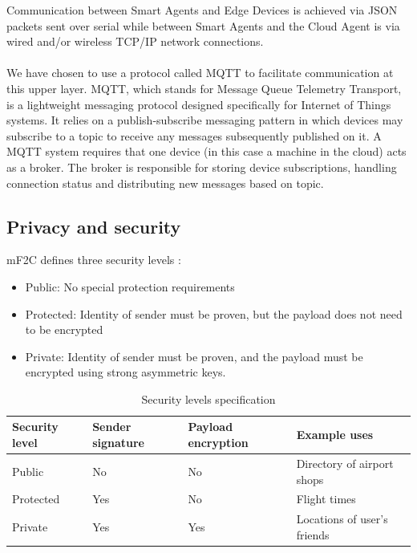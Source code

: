 Communication between Smart Agents and Edge Devices is achieved via JSON packets sent over serial while between Smart Agents and the Cloud Agent is via wired and/or wireless TCP/IP network connections.
 
\paragraph{}
We have chosen to use a protocol called MQTT to facilitate communication at this upper layer. MQTT, which stands for Message Queue Telemetry Transport, is a lightweight messaging protocol designed specifically for Internet of Things systems. It relies on a publish-subscribe messaging pattern in which devices may subscribe to a topic to receive any messages subsequently published on it. A MQTT system requires that one device (in this case a machine in the cloud) acts as a broker. The broker is responsible for storing device subscriptions, handling connection status and distributing new messages based on topic.

\subsection{Privacy and security}

mF2C defines three security levels \cite{mf2cwebsite}:

\begin{itemize}
    \item Public: No special protection requirements
    \item Protected: Identity of sender must be proven, but the payload does not need to be encrypted
    \item Private: Identity of sender must be proven, and the payload must be encrypted using strong asymmetric keys.
\end{itemize}

\begin{table}[h!]
    \begin{center}
        \begin{tabular}{ |p{2cm}|p{3cm}|p{3cm}|p{4cm}| } 
            \hline
            Security level & Sender signature & Payload encryption & Example uses \\ \hline
            Public & No & No & Directory of airport shops \\ \hline
            Protected & Yes & No & Flight times \\ \hline
            Private & Yes & Yes & Locations of user's friends \\
            \hline
        \end{tabular}
        \caption{Security levels specification}
        \label{table:secure_levels}
    \end{center}
\end{table}    

